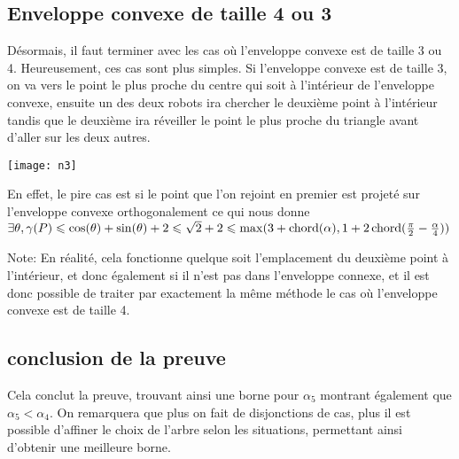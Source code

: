 \subsection{Enveloppe convexe de taille 4 ou 3}\label{conv3}

Désormais, il faut terminer avec les cas où l'enveloppe convexe est de taille 3 ou 4. Heureusement, ces cas sont plus simples.
Si l'enveloppe convexe est de taille 3, on va vers le point le plus proche du centre qui soit à l'intérieur de l'enveloppe convexe, ensuite un des deux robots ira chercher le deuxième point à l'intérieur tandis que le deuxième ira réveiller le point le plus proche du triangle avant d'aller sur les deux autres.

  \texttt{[image: n3]}\label{fig:n3}

En effet, le pire cas est si le point que l'on rejoint en premier est projeté sur l'enveloppe convexe orthogonalement ce qui nous donne $\exists \theta, \gamma(P) \leqslant \cos(\theta) + \sin(\theta) + 2 \leqslant \sqrt{2} + 2 \leqslant \max(3 + \operatorname{chord}(\alpha), 1 + 2\operatorname{chord}(\frac{\pi}{2} - \frac{\alpha}{4}))$

Note: En réalité, cela fonctionne quelque soit l'emplacement du deuxième point à l'intérieur, et donc également si il n'est pas dans l'enveloppe connexe, et il est donc possible de traiter par exactement la même méthode le cas où l'enveloppe convexe est de taille 4.

\subsection{conclusion de la preuve}

Cela conclut la preuve, trouvant ainsi une borne pour $\alpha_5$ montrant également que $\alpha_5 < \alpha_4$. On remarquera que plus on fait de disjonctions de cas, plus il est possible d'affiner le choix de l'arbre selon les situations, permettant ainsi d'obtenir une meilleure borne.